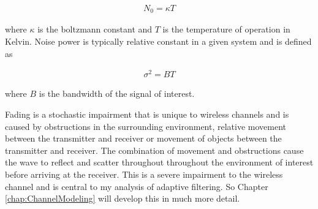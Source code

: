 \begin{align}
	N_{0} = \kappa T
\end{align}

where $\kappa$ is the boltzmann %
constant and $T$ is the temperature %
of operation in Kelvin. Noise %
power is typically relative constant %
in a given system and is defined as

\begin{align}
	\sigma^{2} = BT
\end{align}

where $B$ is the bandwidth of the %
signal of interest.

Fading is a stochastic impairment %
that is unique to wireless %
channels and is caused by obstructions %
in the surrounding environment, %
relative movement between the %
transmitter and receiver %
or movement of objects between %
the transmitter and receiver. The %
combination of movement and %
obstructions cause the wave to %
reflect and scatter throughout %
throughout the environment of %
interest before arriving %
at the receiver. This is a %
severe impairment to the wireless %
channel and is central to my %
analysis of adaptive filtering. So %
Chapter \ref{chap:ChannelModeling} %
will develop this in much more detail.

